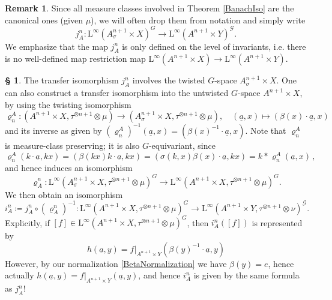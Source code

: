 \documentclass[11pt, oneside]{amsart}
\theoremstyle{definition}
\newtheorem{no}[lemma]{\S}
\newtheorem{remark}[lemma]{Remark}
\theoremstyle{remark}
\theoremstyle{TheoremNum}
\newcommand{\Linf}{\mathrm{L}^{\infty}}
\newcommand{\cG}{\mathcal{G}}
\begin{document}
\begin{remark} Since all measure classes involved in Theorem \ref{BanachIso} are the canonical ones (given $\mu$), we will often drop them from notation and simply write
\[
j^{n}_A: \Linf(A^{n+1}_\sigma \times X)^G \to  \Linf(A^{n+1} \times Y)^{\cG}.
\]
We emphasize that the map $j^n_A$ is only defined on the level of invariants, i.e. there is no well-defined map  restriction map $\Linf(A^{n+1} \times X) \to \Linf(A^{n+1} \times Y)$.
\end{remark}
\begin{no} The transfer isomorphism $j^n_A$ involves the twisted $G$-space $A^{n+1}_\sigma \times X$. One can also construct a transfer isomorphism into the untwisted $G$-space $A^{n+1} \times X$, by using the twisting isomorphism
  \begin{equation}
  \varrho^A_n:(A^{n+1}\times X,\tau^{\otimes n+1}\otimes \mu)\to (A_{\sigma}^{n+1}\times X,\tau^{\otimes n+1}\otimes \mu), \quad (\underline{a},x) \mapsto (\beta(x)\cdot \underline{a},x)
\end{equation}
and its inverse as given by $(\varrho^A_n)^{-1}(\underline{a},x) = (\beta(x)^{-1} \cdot \underline{a}, x)$. Note that $\varrho^A_n$ is measure-class preserving; it is also $G$-equivariant, since
\[
    \varrho^A_n(k\cdot \underline{a},kx)=(\beta(kx)k\cdot \underline{a},kx)=(\sigma(k,x)\beta(x)\cdot \underline{a},kx)= k\ast \varrho^A_n(\underline{a},x)\,,
\]
and hence induces an isomorphism 
\begin{equation}
\varrho_A^n:\Linf(A_{\sigma}^{n+1}\times X,\tau^{\otimes n+1}\otimes \mu)^G \to \Linf(A^{n+1}\times X,\tau^{\otimes n+1}\otimes \mu)^G.
\end{equation}
We then obtain an isomorphism
\begin{equation}
i^n_A \coloneqq j^n_A\circ (\varrho^n_A)^{-1}: \Linf(A^{n+1} \times X, \tau^{\otimes n+1}\otimes \mu)^G \to \Linf(A^{n+1} \times Y, \tau^{\otimes n+1}\otimes \nu)^{\cG}.
\end{equation}
Explicitly, if $[f] \in  \Linf(A^{n+1} \times X, \tau^{\otimes n+1}\otimes \mu)^G$, then $i^n_A([f])$ is represented by
\[
h(\underline{a}, y) =  f|_{A^{n+1} \times Y}(\beta(y)^{-1} \cdot\underline{a}, y)
\]
However, by our normalization \eqref{BetaNormalization} we have $\beta(y) = e$, hence actually $h(\underline{a}, y) =  f|_{A^{n+1} \times Y}(\underline{a}, y)$, and hence $i^n_A$ is given by the same formula as $j^n_A$!
\end{no}
\end{document}
